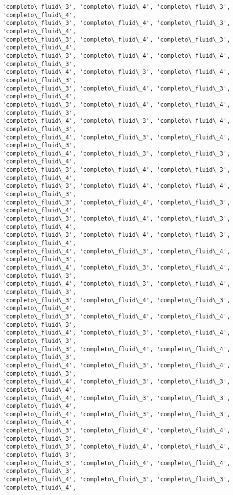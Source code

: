\documentclass[11pt]{article}
\begin{document}
\begin{Verbatim}[commandchars=\\\{\}]
'completo\_fluid\_3', 'completo\_fluid\_4', 'completo\_fluid\_3', 'completo\_fluid\_4',
'completo\_fluid\_3', 'completo\_fluid\_4', 'completo\_fluid\_3', 'completo\_fluid\_4',
'completo\_fluid\_3', 'completo\_fluid\_4', 'completo\_fluid\_3', 'completo\_fluid\_4',
'completo\_fluid\_3', 'completo\_fluid\_4', 'completo\_fluid\_4', 'completo\_fluid\_3',
'completo\_fluid\_4', 'completo\_fluid\_3', 'completo\_fluid\_4', 'completo\_fluid\_3',
'completo\_fluid\_3', 'completo\_fluid\_4', 'completo\_fluid\_3', 'completo\_fluid\_4',
'completo\_fluid\_3', 'completo\_fluid\_4', 'completo\_fluid\_4', 'completo\_fluid\_3',
'completo\_fluid\_4', 'completo\_fluid\_3', 'completo\_fluid\_4', 'completo\_fluid\_3',
'completo\_fluid\_4', 'completo\_fluid\_3', 'completo\_fluid\_4', 'completo\_fluid\_3',
'completo\_fluid\_4', 'completo\_fluid\_3', 'completo\_fluid\_3', 'completo\_fluid\_4',
'completo\_fluid\_3', 'completo\_fluid\_4', 'completo\_fluid\_3', 'completo\_fluid\_4',
'completo\_fluid\_3', 'completo\_fluid\_4', 'completo\_fluid\_4', 'completo\_fluid\_3',
'completo\_fluid\_3', 'completo\_fluid\_4', 'completo\_fluid\_3', 'completo\_fluid\_4',
'completo\_fluid\_3', 'completo\_fluid\_4', 'completo\_fluid\_3', 'completo\_fluid\_4',
'completo\_fluid\_3', 'completo\_fluid\_4', 'completo\_fluid\_3', 'completo\_fluid\_4',
'completo\_fluid\_4', 'completo\_fluid\_3', 'completo\_fluid\_4', 'completo\_fluid\_3',
'completo\_fluid\_4', 'completo\_fluid\_3', 'completo\_fluid\_4', 'completo\_fluid\_3',
'completo\_fluid\_4', 'completo\_fluid\_3', 'completo\_fluid\_4', 'completo\_fluid\_3',
'completo\_fluid\_3', 'completo\_fluid\_4', 'completo\_fluid\_3', 'completo\_fluid\_4',
'completo\_fluid\_3', 'completo\_fluid\_4', 'completo\_fluid\_4', 'completo\_fluid\_3',
'completo\_fluid\_4', 'completo\_fluid\_3', 'completo\_fluid\_4', 'completo\_fluid\_3',
'completo\_fluid\_3', 'completo\_fluid\_4', 'completo\_fluid\_4', 'completo\_fluid\_3',
'completo\_fluid\_4', 'completo\_fluid\_3', 'completo\_fluid\_4', 'completo\_fluid\_3',
'completo\_fluid\_4', 'completo\_fluid\_3', 'completo\_fluid\_3', 'completo\_fluid\_4',
'completo\_fluid\_4', 'completo\_fluid\_3', 'completo\_fluid\_3', 'completo\_fluid\_4',
'completo\_fluid\_4', 'completo\_fluid\_3', 'completo\_fluid\_3', 'completo\_fluid\_4',
'completo\_fluid\_3', 'completo\_fluid\_4', 'completo\_fluid\_4', 'completo\_fluid\_3',
'completo\_fluid\_3', 'completo\_fluid\_4', 'completo\_fluid\_4', 'completo\_fluid\_3',
'completo\_fluid\_3', 'completo\_fluid\_4', 'completo\_fluid\_4', 'completo\_fluid\_3',
'completo\_fluid\_4', 'completo\_fluid\_3', 'completo\_fluid\_3', 'completo\_fluid\_4',

\end{Verbatim}
\end{document}
